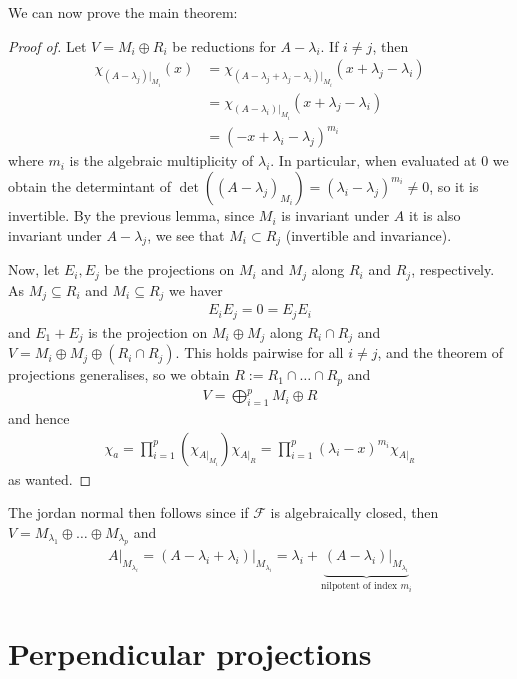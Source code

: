 \documentclass[10pt,twoside,openany,final]{memoir}
\theoremstyle{break}
\theoremstyle{Break}
\newcommand{\F}{\mathcal{F}}
\begin{document}
We can now prove the main theorem: 
\begin{proof}[Proof of]
Let $V=M_i \oplus R_i$ be reductions for $A-\lambda_i$. If $i \neq j$, then 
\begin{align*}
	\chi_{\left( A-\lambda_j \right)\big|_{M_i}}(x)&=\chi_{\left( A-\lambda_j+\lambda_j-\lambda_i \right)\big|_{M_i}}(x+\lambda_j-\lambda_i)\\
	&=\chi_{\left( A-\lambda_i \right)\big|_{M_i}}(x+\lambda_j-\lambda_i)\\
	&=(-x+\lambda_i-\lambda_j)^{m_i}
\end{align*}
where $m_i$ is the algebraic multiplicity of $\lambda_i$. In particular, when evaluated at $0$ we obtain the determintant of $\det((A-\lambda_j)_{M_i})=(\lambda_i-\lambda_j)^{m_i}\neq 0$, so it is invertible. By the previous lemma, since $M_i$ is invariant under $A$ it is also invariant under $A-\lambda_j$, we see that $M_i \subset R_j$ (invertible and invariance).

Now, let $E_i,E_j$ be the projections on $ M_i$ and $M_j$ along $R_i$ and $R_j$, respectively. As $M_j \subseteq R_i$ and $M_i \subseteq R_j$ we haver
\begin{align*}
	E_i E_j = 0 = E_j E_i
\end{align*}
and $E_1+E_j$ is the projection on $M_i \oplus M_j $ along $R_i \cap R_j$ and $V=M_i \oplus M_j \oplus \left( R_i \cap R_j \right)$. This holds pairwise for all $i \neq j$, and the theorem of projections generalises, so we obtain $R:=R_1 \cap \dots \cap R_p$ and
\begin{align*}
	V=\bigoplus_{i=1}^p M_i \oplus R
\end{align*}
and hence
\begin{align*}
	\chi_a=\prod_{i=1}^p \left( \chi_{A \big| _{M_i}} \right) \chi_{A \big|_R}=\prod_{i=1}^p (\lambda_i-x)^{m_i}\chi_{A \big|_R}
\end{align*}
as wanted.
\end{proof}
The jordan normal then follows since if $\F$ is algebraically closed, then $V= M_{\lambda_1}\oplus \dots \oplus M_{\lambda_p}$ and 
\begin{align*}
	A\big|_{M_{\lambda_i}}=\left(A-\lambda_i+\lambda_i\right)\big|_{M_{\lambda_i}}=\lambda_i+\underbrace{\left( A-\lambda_i \right)\big|_{M_{\lambda_i}}}_{\text{nilpotent of index }m_i }
\end{align*}

\chapter{Perpendicular projections}
\end{document}
